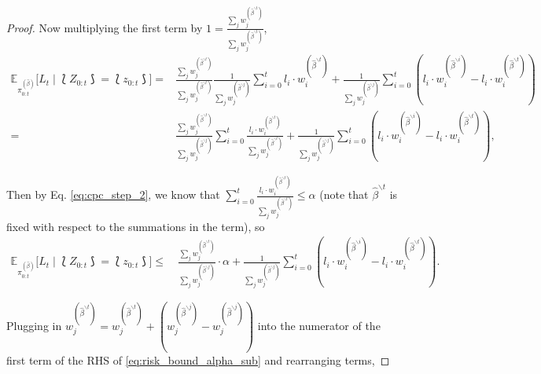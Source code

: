 \begin{proof}
Now multiplying the first term by $1 = \frac{\sum_{j}w_j^{(\hat\beta^{\backslash t})}}{\sum_{j}w_j^{(\hat\beta^{\backslash t})}}$,
\begin{align*}
    \mathbb{E}_{\pi_{0:t}^{(\hat\beta)}}\Big[L_{t} \mid \lbag Z_{0:t} \rbag = \lbag z_{0:t} \rbag\Big] 
    = & \frac{\sum_{j}w_j^{(\hat\beta^{\backslash t})}}{\sum_{j}w_j^{(\hat\beta^{\backslash t})}}\frac{1}{\sum_{j}w_j^{(\hat\beta^{\backslash j})}}\sum_{i=0}^{t}l_i\cdot w_i^{(\hat\beta^{\backslash t})} +  \frac{1}{\sum_{j}w_j^{(\hat\beta^{\backslash j})}}\sum_{i=0}^{t}(l_i\cdot w_i^{(\hat\beta^{\backslash i})} - l_i\cdot w_i^{(\hat\beta^{\backslash t})}) \\
    = & \frac{\sum_{j}w_j^{(\hat\beta^{\backslash t})}}{\sum_{j}w_j^{(\hat\beta^{\backslash j})}}\sum_{i=0}^{t}\frac{l_i\cdot w_i^{(\hat\beta^{\backslash t})}}{\sum_{j}w_j^{(\hat\beta^{\backslash t})}} +  \frac{1}{\sum_{j}w_j^{(\hat\beta^{\backslash j})}}\sum_{i=0}^{t}(l_i\cdot w_i^{(\hat\beta^{\backslash i})} - l_i\cdot w_i^{(\hat\beta^{\backslash t})}),
\end{align*}

Then by Eq. \eqref{eq:cpc_step_2}, we know that $\sum_{i=0}^{t}\frac{l_i\cdot w_i^{(\hat\beta^{\backslash t})}}{\sum_{j}w_j^{(\hat\beta^{\backslash t})}} \leq \alpha$ (note that $\hat\beta^{\backslash t}$ is fixed with respect to the summations in the term), so
\begin{align}\label{eq:risk_bound_alpha_sub}
    \mathbb{E}_{\pi_{0:t}^{(\hat\beta)}}\Big[L_{t} \mid \lbag Z_{0:t} \rbag = \lbag z_{0:t} \rbag\Big] 
    \leq & \ \frac{\sum_{j}w_j^{(\hat\beta^{\backslash t})}}{\sum_{j}w_j^{(\hat\beta^{\backslash j})}}\cdot\alpha +  \frac{1}{\sum_{j}w_j^{(\hat\beta^{\backslash j})}}\sum_{i=0}^{t}(l_i\cdot w_i^{(\hat\beta^{\backslash i})} - l_i\cdot w_i^{(\hat\beta^{\backslash t})}).
\end{align}

Plugging in $w_j^{(\hat\beta^{\backslash t})} = w_j^{(\hat\beta^{\backslash t})} + (w_j^{(\hat\beta^{\backslash j})} - w_j^{(\hat\beta^{\backslash j})})$ into the numerator of the first term of the RHS of \eqref{eq:risk_bound_alpha_sub} and rearranging terms,


\end{proof}
